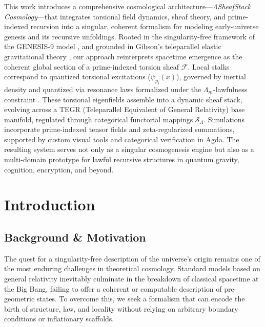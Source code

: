\documentclass{article}
\theoremstyle{plain}
\begin{document}
\vspace{1em}


\nolinenumbers

This work introduces a comprehensive cosmological architecture—\textit{ΛSheafStack Cosmology}—that integrates torsional field dynamics, sheaf theory, and prime-indexed recursion into a singular, coherent formalism for modeling early-universe genesis and its recursive unfoldings. Rooted in the singularity-free framework of the GENESIS-9 model \cite{sorensen2025genesis}, and grounded in Gibson’s teleparallel elastic gravitational theory \cite{gibson2025field,gibson2025overview}, our approach reinterprets spacetime emergence as the coherent global section of a prime-indexed torsion sheaf $\mathcal{F}$. Local stalks correspond to quantized torsional excitations ($\psi_{p_i}(x)$), governed by inertial density and quantized via resonance laws formalized under the $\Lambda_m$-lawfulness constraint \cite{vanGelder2025Multiplicity,vanGelder2025PIRTM}. These torsional eigenfields assemble into a dynamic sheaf stack, evolving across a TEGR (Teleparallel Equivalent of General Relativity) base manifold, regulated through categorical functorial mappings $\mathcal{S}_\Lambda$. Simulations incorporate prime-indexed tensor fields and zeta-regularized summations, supported by custom visual tools and categorical verification in Agda. The resulting system serves not only as a singular cosmogenesis engine but also as a multi-domain prototype for lawful recursive structures in quantum gravity, cognition, encryption, and beyond.

\section{Introduction}

\subsection{Background \& Motivation}

The quest for a singularity-free description of the universe’s origin remains one of the most enduring challenges in theoretical cosmology. Standard models based on general relativity inevitably culminate in the breakdown of classical spacetime at the Big Bang, failing to offer a coherent or computable description of pre-geometric states. To overcome this, we seek a formalism that can encode the birth of structure, law, and locality without relying on arbitrary boundary conditions or inflationary scaffolds.
\end{document}
